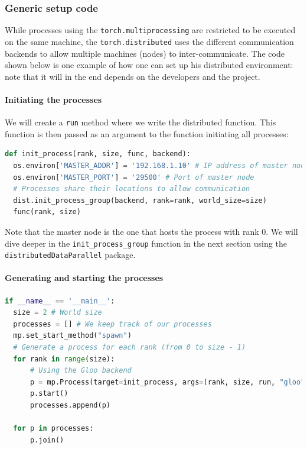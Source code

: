 \documentclass{article}
\begin{document}
\subsubsection{Generic setup code}
While processes using the \lstinline{torch.multiprocessing} are restricted to be executed on the same machine, the \lstinline{torch.distributed} uses the different communication backends to allow multiple machines (nodes) to inter-communicate. The  code shown below is one example of how one can set up his distributed environment: note that it will in the end depends on the developers and the project.

\paragraph{Initiating the processes}
We will create a \lstinline{run} method where we write the distributed function. This function is then passed as an argument to the function initiating all processes:

\begin{lstlisting}[language=Python]
def init_process(rank, size, func, backend):
  os.environ['MASTER_ADDR'] = '192.168.1.10' # IP address of master node
  os.environ['MASTER_PORT'] = '29500' # Port of master node
  # Processes share their locations to allow communication
  dist.init_process_group(backend, rank=rank, world_size=size)
  func(rank, size)
\end{lstlisting}

Note that the master node is the one that hosts the process with rank 0. We will dive deeper in the \lstinline{init_process_group} function in the next section using the \lstinline{distributedDataParallel} package.

\paragraph{Generating and starting the processes}
\begin{lstlisting}[language=Python]
if __name__ == '__main__':
  size = 2 # World size
  processes = [] # We keep track of our processes
  mp.set_start_method("spawn")
  # Generate a process for each rank (from 0 to size - 1)
  for rank in range(size):
      # Using the Gloo backend
      p = mp.Process(target=init_process, args=(rank, size, run, "gloo"))
      p.start()
      processes.append(p)

  for p in processes:
      p.join()
\end{lstlisting}
\end{document}
